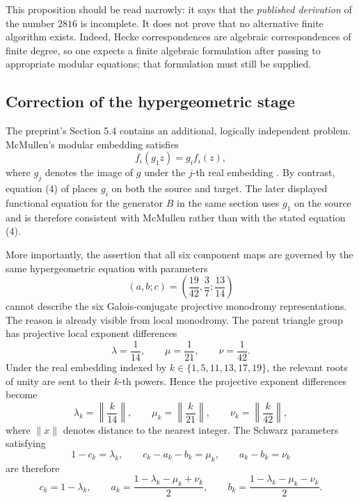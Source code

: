 This proposition should be read narrowly: it says that the \emph{published derivation} of the number $2816$ is incomplete. It does not prove that no alternative finite algorithm exists. Indeed, Hecke correspondences are algebraic correspondences of finite degree, so one expects a finite algebraic formulation after passing to appropriate modular equations; that formulation must still be supplied.


\subsection{Correction of the hypergeometric stage}\label{sec:hypergeom}
The preprint's Section 5.4 contains an additional, logically independent problem. McMullen's modular embedding satisfies
\begin{equation}\label{eq:correct-equiv}
 f_i(g_1 z)=g_i f_i(z),
\end{equation}
where $g_j$ denotes the image of $g$ under the $j$-th real embedding \cite[Sec.~6, Eq.~(6.1)]{McMullen2026}. By contrast, equation (4) of \cite[Sec.~5.4]{Mostaed2026} places $g_i$ on both the source and target. The later displayed functional equation for the generator $B$ in the same section uses $g_1$ on the source and is therefore consistent with McMullen rather than with the stated equation (4).

More importantly, the assertion that all six component maps are governed by the same hypergeometric equation with parameters
\[
 (a,b;c)=\left(\frac{19}{42},\frac37;\frac{13}{14}\right)
\]
cannot describe the six Galois-conjugate projective monodromy representations. The reason is already visible from local monodromy. The parent triangle group has projective local exponent differences
\[
 \lambda=\frac1{14},\qquad \mu=\frac1{21},\qquad \nu=\frac1{42}.
\]
Under the real embedding indexed by $k\in\{1,5,11,13,17,19\}$, the relevant roots of unity are sent to their $k$-th powers. Hence the projective exponent differences become
\begin{equation}\label{eq:galois-exponents}
 \lambda_k=\left\|\frac{k}{14}\right\|,
 \qquad
 \mu_k=\left\|\frac{k}{21}\right\|,
 \qquad
 \nu_k=\left\|\frac{k}{42}\right\|,
\end{equation}
where $\|x\|$ denotes distance to the nearest integer. The Schwarz parameters satisfying
\[
 1-c_k=\lambda_k,\qquad c_k-a_k-b_k=\mu_k,
 \qquad a_k-b_k=\nu_k
\]
are therefore
\begin{equation}\label{eq:hgparamformula}
 c_k=1-\lambda_k,\qquad
 a_k=\frac{1-\lambda_k-\mu_k+\nu_k}{2},\qquad
 b_k=\frac{1-\lambda_k-\mu_k-\nu_k}{2}.
\end{equation}

